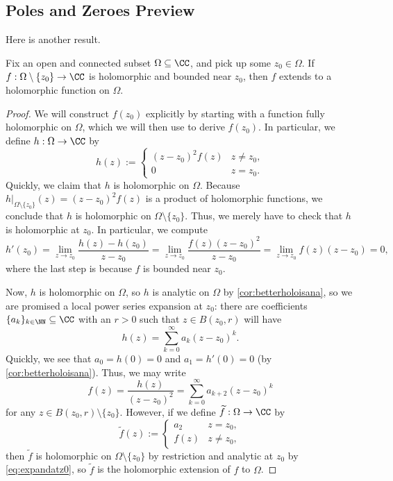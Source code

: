 \subsection{Poles and Zeroes Preview}
Here is another result.
\begin{theorem}
	Fix an open and connected subset $\Omega\subseteq\CC$, and pick up some $z_0\in\Omega$. If $f:\Omega\setminus\{z_0\}\to\CC$ is holomorphic and bounded near $z_0$, then $f$ extends to a holomorphic function on $\Omega$.
\end{theorem}
\begin{proof}
	We will construct $f(z_0)$ explicitly by starting with a function fully holomorphic on $\Omega$, which we will then use to derive $f(z_0)$. In particular, we define $h:\Omega\to\CC$ by
	\[h(z):=\begin{cases}
		(z-z_0)^2f(z) & z\ne z_0, \\
		0 & z=z_0.
	\end{cases}\]
	Quickly, we claim that $h$ is holomorphic on $\Omega$. Because $h|_{\Omega\setminus\{z_0\}}(z)=(z-z_0)^2f(z)$ is a product of holomorphic functions, we conclude that $h$ is holomorphic on $\Omega\setminus\{z_0\}$. Thus, we merely have to check that $h$ is holomorphic at $z_0$. In particular, we compute
	\[h'(z_0)=\lim_{z\to z_0}\frac{h(z)-h(z_0)}{z-z_0}=\lim_{z\to z_0}\frac{f(z)(z-z_0)^2}{z-z_0}=\lim_{z\to z_0}f(z)(z-z_0)=0,\]
	where the last step is because $f$ is bounded near $z_0$.

	Now, $h$ is holomorphic on $\Omega$, so $h$ is analytic on $\Omega$ by \autoref{cor:betterholoisana}, so we are promised a local power series expansion at $z_0$: there are coefficients $\{a_k\}_{k\in\NN}\subseteq\CC$ with an $r>0$ such that $z\in B(z_0,r)$ will have
	\[h(z)=\sum_{k=0}^\infty a_k(z-z_0)^k.\]
	Quickly, we see that $a_0=h(0)=0$ and $a_1=h'(0)=0$ (by \autoref{cor:betterholoisana}). Thus, we may write
	\[f(z)=\frac{h(z)}{(z-z_0)^2}=\sum_{k=0}^\infty a_{k+2}(z-z_0)^k\tag{$*$}\label{eq:expandatz0}\]
	for any $z\in B(z_0,r)\setminus\{z_0\}$. However, if we define $\widetilde f:\Omega\to\CC$ by
	\[\widetilde f(z):=\begin{cases}
		a_2 & z=z_0, \\
		f(z) & z\ne z_0,
	\end{cases}\]
	then $\widetilde f$ is holomorphic on $\Omega\setminus\{z_0\}$ by restriction and analytic at $z_0$ by \autoref{eq:expandatz0}, so $\widetilde f$ is the holomorphic extension of $f$ to $\Omega$.
\end{proof}
